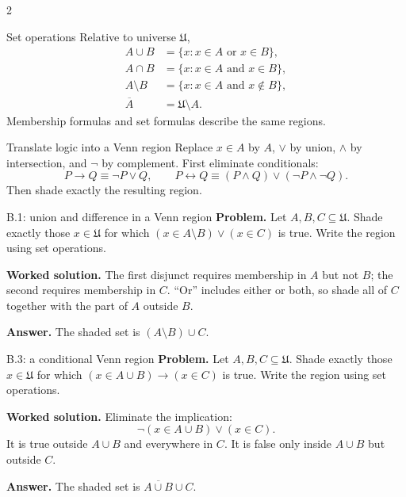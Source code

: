 \documentclass[10pt]{article}
\newcommand{\U}{\mathfrak U}
\newcommand{\vennregion}[3]{%
  \begin{scope}
    \ifnum#1=1\relax\pgfsetnonzerorule\clip (-0.55,0.3) circle (0.95);\else
      \pgfseteorule\clip (-1.65,-1.65) rectangle (1.65,1.45)
        (-0.55,0.3) circle (0.95);\fi
    \ifnum#2=1\relax\pgfsetnonzerorule\clip (0.55,0.3) circle (0.95);\else
      \pgfseteorule\clip (-1.65,-1.65) rectangle (1.65,1.45)
        (0.55,0.3) circle (0.95);\fi
    \ifnum#3=1\relax\pgfsetnonzerorule\clip (0,-0.6) circle (0.95);\else
      \pgfseteorule\clip (-1.65,-1.65) rectangle (1.65,1.45)
        (0,-0.6) circle (0.95);\fi
    \fill[CoreTeal!28] (-1.65,-1.65) rectangle (1.65,1.45);
  \end{scope}}
\newcommand{\vennframe}{%
  \draw[CoreNavy,thick] (-1.65,-1.65) rectangle (1.65,1.45);
  \draw[CoreNavy] (-0.55,0.3) circle (0.95);
  \draw[CoreNavy] (0.55,0.3) circle (0.95);
  \draw[CoreNavy] (0,-0.6) circle (0.95);
  \node[fill=white,inner sep=1pt] at (-1,0.9) {$A$};
  \node[fill=white,inner sep=1pt] at (1,0.9) {$B$};
  \node[fill=white,inner sep=1pt] at (0,-1.25) {$C$};
  \node[anchor=north west,inner sep=2pt] at (-1.65,1.45) {$\U$};}
\begin{document}
\begin{multicols}{2}
\begin{definitionbox}{Set operations}
Relative to universe $\U$,
\begin{align*}
A\cup B&=\{x:x\in A\text{ or }x\in B\},\\
A\cap B&=\{x:x\in A\text{ and }x\in B\},\\
A\setminus B&=\{x:x\in A\text{ and }x\notin B\},\\
\overline A&=\U\setminus A.
\end{align*}
Membership formulas and set formulas describe the same regions.
\end{definitionbox}

\begin{methodbox}{Translate logic into a Venn region}
Replace $x\in A$ by $A$, $\lor$ by union, $\land$ by intersection, and
$\neg$ by complement. First eliminate conditionals:
\[
P\to Q\equiv\neg P\lor Q,
\qquad
P\leftrightarrow Q\equiv(P\land Q)\lor(\neg P\land\neg Q).
\]
Then shade exactly the resulting region.
\end{methodbox}

\begin{workedbox}{B.1: union and difference in a Venn region}
\textbf{Problem.} Let $A,B,C\subseteq\U$. Shade exactly those $x\in\U$ for
which $(x\in A\setminus B)\lor(x\in C)$ is true. Write the region using
set operations.

\textbf{Worked solution.} The first disjunct requires membership in $A$ but
not $B$; the second requires membership in $C$. ``Or'' includes either or both,
so shade all of $C$ together with the part of $A$ outside $B$.
\begin{center}
\end{center}
\textbf{Answer.} The shaded set is $(A\setminus B)\cup C$.
\end{workedbox}

\begin{workedbox}{B.3: a conditional Venn region}
\textbf{Problem.} Let $A,B,C\subseteq\U$. Shade exactly those $x\in\U$ for
which $(x\in A\cup B)\to(x\in C)$ is true. Write the region using set operations.

\textbf{Worked solution.} Eliminate the implication:
\[
\neg(x\in A\cup B)\lor(x\in C).
\]
It is true outside $A\cup B$ and everywhere in $C$. It is false only inside
$A\cup B$ but outside $C$.
\begin{center}
\end{center}
\textbf{Answer.} The shaded set is $\overline{A\cup B}\cup C$.
\end{workedbox}


\end{multicols}
\end{document}
